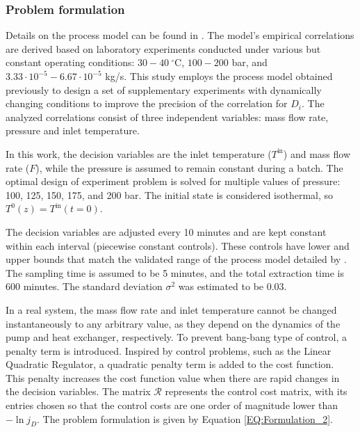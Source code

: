 \documentclass[../Article_Design_of_Experiment.tex]{subfiles}
\begin{document}
	\subsubsection{Problem formulation}
	
	Details on the process model can be found in \citet{Sliczniuk2024}. The model's empirical correlations are derived based on laboratory experiments conducted under various but constant operating conditions: $30 - 40~^\circ\text{C}$, $100 - 200$ bar, and $3.33 \cdot 10^{-5} - 6.67 \cdot 10^{-5}$ kg/s. This study employs the process model obtained previously to design a set of supplementary experiments with dynamically changing conditions to improve the precision of the correlation for $D_i$. The analyzed correlations consist of three independent variables: mass flow rate, pressure and inlet temperature. 
	
	In this work, the decision variables are the inlet temperature ($T^{\text{in}}$) and mass flow rate ($F$), while the pressure is assumed to remain constant during a batch. The optimal design of experiment problem is solved for multiple values of pressure: 100, 125, 150, 175, and 200 bar. The initial state is considered isothermal, so $T^0(z) = T^{\text{in}}(t=0)$.
	
	The decision variables are adjusted every 10 minutes and are kept constant within each interval (piecewise constant controls). These controls have lower and upper bounds that match the validated range of the process model detailed by \citet{Sliczniuk2024}. The sampling time is assumed to be 5 minutes, and the total extraction time is 600 minutes. The standard deviation $\sigma^2$ was estimated to be 0.03.
	
	In a real system, the mass flow rate and inlet temperature cannot be changed instantaneously to any arbitrary value, as they depend on the dynamics of the pump and heat exchanger, respectively. To prevent bang-bang type of control, a penalty term is introduced. Inspired by control problems, such as the Linear Quadratic Regulator, a quadratic penalty term is added to the cost function. This penalty increases the cost function value when there are rapid changes in the decision variables. The matrix $\mathcal{R}$ represents the control cost matrix, with its entries chosen so that the control costs are one order of magnitude lower than $-\ln j_D$. The problem formulation is given by Equation \ref{EQ:Formulation_2}.
	
\end{document}
